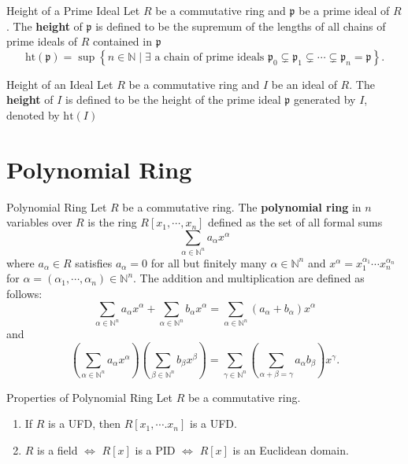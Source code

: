 \begin{definition}{Height of a Prime Ideal}{}
    Let $R$ be a commutative ring and $\mathfrak{p}$ be a prime ideal of $R$. The \textbf{height} of $\mathfrak{p}$ is defined to be the supremum of the lengths of all chains of prime ideals of $R$ contained in $\mathfrak{p}$
    \[
    \mathrm{ht}(\mathfrak{p})=\sup\left\{n\in\mathbb{N}\mid\exists\text{ a chain of prime ideals }\mathfrak{p}_0\subsetneq\mathfrak{p}_1\subsetneq\cdots\subsetneq\mathfrak{p}_n=\mathfrak{p}\right\}.
    \]
\end{definition}

\begin{definition}{Height of an Ideal}{}
    Let $R$ be a commutative ring and $I$ be an ideal of $R$. The \textbf{height} of $I$ is defined to be the height of the prime ideal $\mathfrak{p}$ generated by $I$, denoted by $\mathrm{ht}(I)$
\end{definition}


\section{Polynomial Ring}
\begin{definition}{Polynomial Ring}{}
    Let $R$ be a commutative ring. The \textbf{polynomial ring} in $n$ variables over $R$ is the ring $R[x_1,\cdots,x_n]$ defined as the set of all formal sums $$\sum_{\alpha\in\mathbb{N}^n}a_\alpha x^\alpha$$ where $a_\alpha\in R$ satisfies $a_\alpha=0$ for all but finitely many $\alpha\in\mathbb{N}^n$ and $x^\alpha=x_1^{\alpha_1}\cdots x_n^{\alpha_n}$ for $\alpha=(\alpha_1,\cdots,\alpha_n)\in\mathbb{N}^n$. The addition and multiplication are defined as follows: $$\sum_{\alpha\in\mathbb{N}^n}a_\alpha x^\alpha+\sum_{\alpha\in\mathbb{N}^n}b_\alpha x^\alpha=\sum_{\alpha\in\mathbb{N}^n}(a_\alpha+b_\alpha)x^\alpha$$ and $$\left(\sum_{\alpha\in\mathbb{N}^n}a_\alpha x^\alpha\right)\left(\sum_{\beta\in\mathbb{N}^n}b_\beta x^\beta\right)=\sum_{\gamma\in\mathbb{N}^n}\left(\sum_{\alpha+\beta=\gamma}a_\alpha b_\beta\right)x^\gamma.$$
\end{definition}


\begin{proposition}{Properties of Polynomial Ring}{}
    Let $R$ be a commutative ring.
    \begin{enumerate}
        \item If $R$ is a UFD, then $R[x_1,\cdots.x_n]$ is a UFD.
        \item $R$ is a field $\iff$ $R[x]$ is a PID $\iff$ $R[x]$ is an Euclidean domain.
    \end{enumerate}
\end{proposition}


